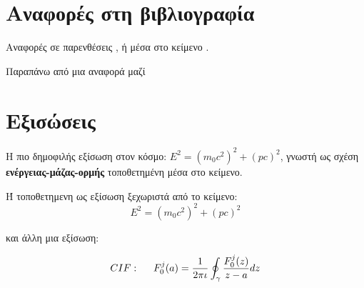 
\section{Αναφορές στη βιβλιογραφία}
Αναφορές σε παρενθέσεις \citep{Gam90}, ή μέσα στο κείμενο \citet{Dou72}.

Παραπάνω από μια αναφορά μαζί \citep{Ancey1996, Enf87, Sim94, Sim96b}


\section{Εξισώσεις}

Η πιο δημοφιλής εξίσωση στον κόσμο: $E^2 = (m_0c^2)^2 + (pc)^2$, γνωστή ως σχέση  \textbf{ενέργειας-μάζας-ορμής} τοποθετημένη μέσα στο κείμενο.

Ή τοποθετημενη ως εξίσωση ξεχωριστά από το κείμενο:
\begin{equation}
\label{eq:enmm}
  E^2 = (m_0c^2)^2 + (pc)^2
\end{equation}

και άλλη μια εξίσωση:

\begin{align}
\label{eq:new}
CIF: \hspace*{5mm}F_0^j(a) = \frac{1}{2\pi \iota} \oint_{\gamma} \frac{F_0^j(z)}{z - a} dz
\end{align}

\nomenclature[g-p]{$\pi$}{ $\simeq 3.14\ldots$}                                             %


\clearpage
